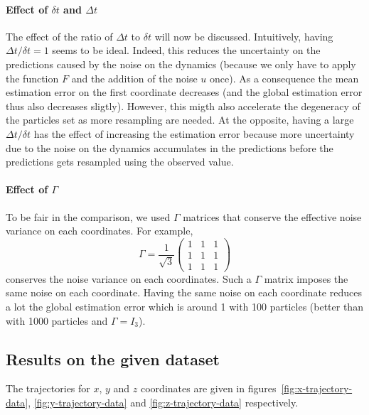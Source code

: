 \documentclass[english, DIV=13]{scrartcl}
\begin{document}
\paragraph{Effect of $\delta t$ and $\Delta t$}
The effect of the ratio of $\Delta t$ to $\delta t$ will now be discussed. Intuitively,
having $\Delta t/\delta t = 1$ seems to be ideal. Indeed, this reduces the uncertainty
on the predictions caused by the noise on the dynamics (because we only have to apply
the function $F$ and the addition of the noise $u$ once). As a consequence the mean
estimation error on the first coordinate decreases (and the global estimation error
thus also decreases sligtly).
However, this migth also accelerate the degeneracy of the particles set as more
resampling are needed. At the opposite, having a large $\Delta t/\delta t$ has the
effect of increasing the estimation error because more uncertainty due to the noise on
the dynamics accumulates in the predictions before the predictions gets resampled using
the observed value.

\paragraph{Effect of $\Gamma$}
To be fair in the comparison, we used $\Gamma$ matrices that conserve the effective
noise variance on each coordinates. For example,
\begin{equation*}
    \Gamma = \frac{1}{\sqrt{3}}
    \begin{pmatrix}
        1 & 1 & 1 \\
        1 & 1 & 1 \\
        1 & 1 & 1
    \end{pmatrix}
\end{equation*}
conserves the noise variance on each coordinates. Such a $\Gamma$ matrix imposes the
same noise on each coordinate. Having the same noise on each coordinate reduces a lot
the global estimation error which is around 1 with 100 particles (better than with
1000 particles and $\Gamma = I_3$).

\subsection{Results on the given dataset}
The trajectories for $x$, $y$ and $z$ coordinates are given in
figures~\ref{fig:x-trajectory-data}, \ref{fig:y-trajectory-data} and
\ref{fig:z-trajectory-data} respectively.
\end{document}
